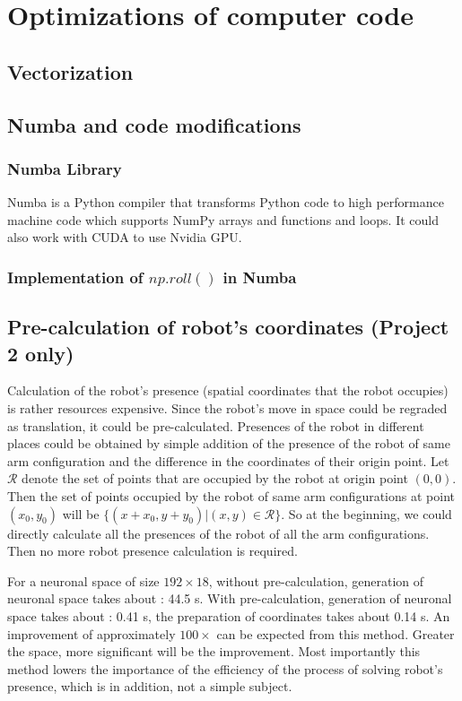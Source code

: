 \chapter{Optimizations of computer code}
\label{cha:optimizaiton}


\section{Vectorization}
\label{sec:optimizaiton_vectorization}

\section{Numba and code modifications}
\label{sec:optimizaiton_numba}
\subsection{Numba Library}
\label{ssec:numba_numba}
Numba is a Python compiler that transforms Python code to high performance machine code which supports NumPy arrays and functions and loops.
It could also work with CUDA to use Nvidia GPU.

\subsection{Implementation of $np.roll()$ in Numba}
\label{ssec:numba_nproll}

\section{Pre-calculation of robot's coordinates (Project 2 only)}
\label{sec:optimizaiton_Precalculation}

Calculation of the robot's presence (spatial coordinates that the robot occupies) is rather resources expensive.
Since the robot's move in space could be regraded as translation, it could be pre-calculated.
Presences of the robot in different places could be obtained by simple addition of the presence of the robot of same arm configuration
and the difference in the coordinates of their origin point.
Let $ \mathcal{R} $ denote the set of points that are occupied by the robot at origin point $(0, 0)$.
Then the set of points occupied by the robot of same arm configurations at point $(x_0, y_0)$
will be $\{(x + x_0, y + y_0)|(x,y)\in\mathcal{R}\}$.
So at the beginning, we could directly calculate all the presences of the robot of all the arm configurations.
Then no more robot presence calculation is required.

For a neuronal space of size $ 192 \times 18 $,
without pre-calculation, generation of neuronal space takes about : 44.5 s.
With pre-calculation, generation of neuronal space takes about : 0.41 s, the preparation
of coordinates takes about 0.14 s.
An improvement of approximately $100\times$ can be expected from this method.
Greater the space, more significant will be the improvement.
Most importantly this method lowers the importance of the efficiency of the process of solving robot’s presence,
which is in addition, not a simple subject.